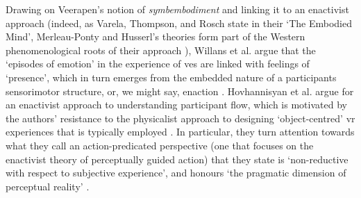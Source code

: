 Drawing on Veerapen's notion of \textit{symbembodiment} and linking it to an enactivist approach (indeed, as Varela, Thompson, and Rosch state in their `The Embodied Mind', Merleau-Ponty and Husserl's theories form part of the Western phenomenological roots of their approach \citeyearpar[pp. 173, 18]{varela1993}), Willans et al. argue that the `episodes of emotion' in the experience of \glspl{ve} are linked with feelings of `presence', which in turn emerges from the embedded nature of a participants sensorimotor structure, or, we might say, enaction \citeyearpar[p. 23]{willans2016}. Hovhannisyan et al. argue for an enactivist approach to understanding participant flow, which is motivated by the authors' resistance to the physicalist approach to designing `object-centred'  \gls{vr} experiences that is typically employed \citeyearpar[p. 1]{hovhannisyan2019}. In particular, they turn attention towards what they call an action-predicated perspective (one that focuses on the enactivist theory of perceptually guided action) that they state is `non-reductive with respect to subjective experience', and honours `the pragmatic dimension of perceptual reality' \citeyearpar[p. 18]{hovhannisyan2019}. 

